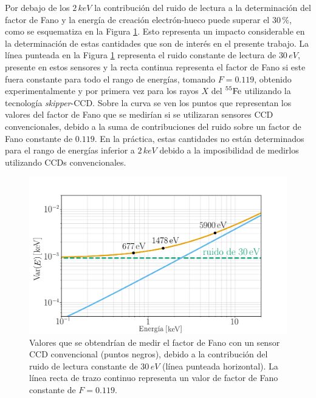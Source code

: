 Por debajo de los $2\,\si{keV}$ la contribución del ruido de lectura a la determinación del factor de Fano y la energía de creación electrón-hueco puede superar el $30\,\%$, como se esquematiza en la Figura \ref{fig:Fano_y_ruido}. Esto representa un impacto considerable en la determinación de estas cantidades que son de interés en el presente trabajo. La línea punteada en la Figura \ref{fig:Fano_y_ruido} representa el ruido constante de lectura de $30\,\si{eV}$, presente en estos sensores y la recta continua representa el factor de Fano si este fuera constante para todo el rango de energías, tomando $F=0.119$, obtenido experimentalmente y por primera vez para los rayos $X$ del $\prescript{55}{}{\mbox{Fe}}$ utilizando la tecnología \textit{skipper}-CCD\cite{Rodrigues}. 
Sobre la curva se ven los puntos que representan los valores del factor de Fano que se medirían si se utilizaran sensores CCD convencionales, debido a la suma de contribuciones del ruido sobre un factor de Fano constante de $0.119$. En la práctica, estas cantidades no están determinados para el rango de energías inferior a $2\,\si{keV}$ debido a la imposibilidad de medirlos utilizando CCDs convencionales.
\begin{figure}[h]
    \centering
        \includegraphics[scale=0.5]{Figs/fano_y_ruido.pdf}
    \caption{Valores que se obtendrían de medir el factor de Fano con un sensor CCD convencional (puntos negros), debido a la contribución del ruido de lectura constante de $30\,\si{eV}$ (línea punteada horizontal). La línea recta de trazo continuo representa un valor de factor de Fano constante de $F = 0.119$.}
    \label{fig:Fano_y_ruido}
\end{figure}

